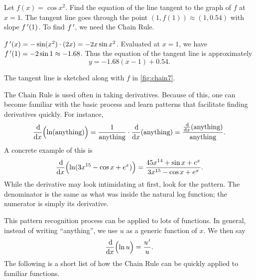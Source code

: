 \begin{example}\label{ex_chain7}%
Let $f(x) = \cos x^2$. Find the equation of the line tangent to the graph of $f$ at $x=1$.
\solution
The tangent line goes through the point $(1,f(1)) \approx (1,0.54)$ with slope $f\,'(1)$. To find $f\,'$, we need the Chain Rule.

$f\,'(x) = -\sin(x^2) \cdot(2x) = -2x\sin x^2$. Evaluated at $x=1$, we have $f\,'(1) = -2\sin 1\approx -1.68$. Thus the equation of the tangent line is approximately
%
%
\[y = -1.68(x-1)+0.54.\]

The tangent line is sketched along with $f$ in \autoref{fig:chain7}.
\end{example}

The Chain Rule is used often in taking derivatives. Because of this, one can become familiar with the basic process and learn  patterns that facilitate finding derivatives quickly. For instance,
\[
 \frac{\operatorname{d}\!}{\operatorname{d}\! x}\Bigl(\ln (\text{anything})\Bigr)
 = \frac{1}{\text{anything}}\cdot\frac{\operatorname{d}\!}{\operatorname{d}\! x}(\text{anything})
 = \frac{\frac{\operatorname{d}\!}{\operatorname{d}\! x}(\text{anything})}{\text{anything}}.
\]
A concrete example of this is
\[
\frac{\operatorname{d}\!}{\operatorname{d}\! x}\Bigl(\ln(3x^{15}-\cos x+e^x)\Bigr)
= \frac{45x^{14}+\sin x+e^x}{3x^{15}-\cos x+e^x}.
\]
While the derivative may  look intimidating at first, look for the pattern. The denominator is the same as what was inside the natural log function; the  numerator is simply its derivative.

This pattern recognition process can be applied to lots of functions. In general, instead of writing ``anything'', we use $u$ as a generic function of $x$. We then say \[\frac{\dd}{\dd x}\Bigl(\ln u\Bigr) = \frac{u\primeskip'}{u}.\]
The following is a short list of how the Chain Rule can be quickly applied to familiar functions.

